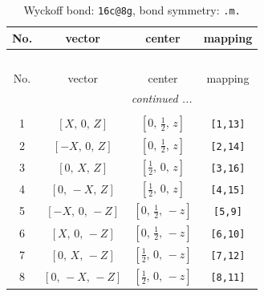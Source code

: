 \documentclass[fleqn,8pt]{jsarticle}
\begin{document}
\renewcommand{\arraystretch}{1.2}
\begin{longtable}{cccc}
\caption{Wyckoff bond: {\tt 16c@8g}, bond symmetry: {\tt .m.}}
 \\
 \hline \hline
No. & vector & center & mapping \\ \hline \endfirsthead

\multicolumn{3}{l}{\tablename\ \thetable{}} \\
 \hline \hline
No. & vector & center & mapping \\ \hline \endhead

 \hline \hline
\multicolumn{3}{r}{\footnotesize\it continued ...} \\ \endfoot

 \hline \hline
\multicolumn{3}{r}{} \\ \endlastfoot

1 & $\left[ X,\, 0,\, Z \right]$ & $\left[ 0,\, \frac{1}{2},\, z \right]$ & {\tt [1,13]} \\ \hline
2 & $\left[ - X,\, 0,\, Z \right]$ & $\left[ 0,\, \frac{1}{2},\, z \right]$ & {\tt [2,14]} \\ \hline
3 & $\left[ 0,\, X,\, Z \right]$ & $\left[ \frac{1}{2},\, 0,\, z \right]$ & {\tt [3,16]} \\ \hline
4 & $\left[ 0,\, - X,\, Z \right]$ & $\left[ \frac{1}{2},\, 0,\, z \right]$ & {\tt [4,15]} \\ \hline
5 & $\left[ - X,\, 0,\, - Z \right]$ & $\left[ 0,\, \frac{1}{2},\, - z \right]$ & {\tt [5,9]} \\ \hline
6 & $\left[ X,\, 0,\, - Z \right]$ & $\left[ 0,\, \frac{1}{2},\, - z \right]$ & {\tt [6,10]} \\ \hline
7 & $\left[ 0,\, X,\, - Z \right]$ & $\left[ \frac{1}{2},\, 0,\, - z \right]$ & {\tt [7,12]} \\ \hline
8 & $\left[ 0,\, - X,\, - Z \right]$ & $\left[ \frac{1}{2},\, 0,\, - z \right]$ & {\tt [8,11]} \\
\end{longtable}
\renewcommand{\arraystretch}{1.2}
\end{document}
